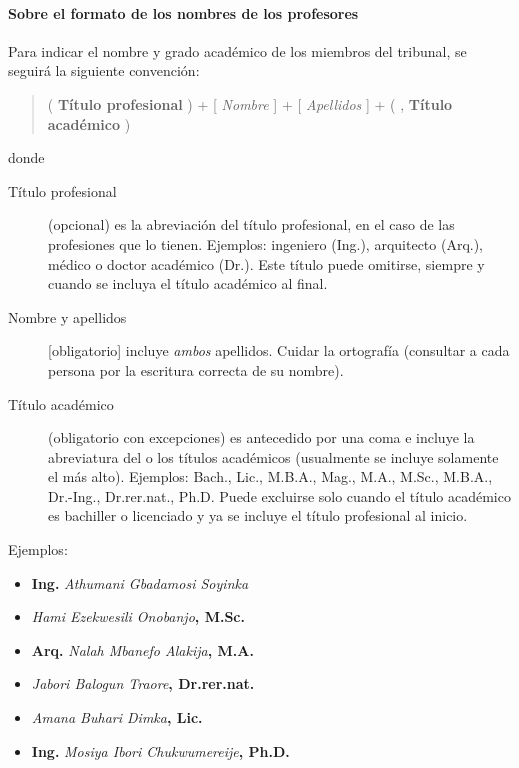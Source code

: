 \paragraph{Sobre el formato de los nombres de los profesores}

Para indicar el nombre y grado académico de los miembros del tribunal, se seguirá la siguiente convención:

\begin{quote}
\centering
( \textbf{Título profesional} ) + [ \textit{Nombre} ] + [ \textit{Apellidos} ] + ( , \textbf{Título académico} )
\end{quote}

donde

\begin{description}
\item[Título profesional] (opcional) es la abreviación del título profesional, en el caso de las profesiones que lo tienen. Ejemplos: ingeniero (Ing.), arquitecto (Arq.), médico o doctor académico (Dr.). Este título puede omitirse, siempre y cuando se incluya el título académico al final.
\item[Nombre y apellidos] [obligatorio] incluye \emph{ambos} apellidos. Cuidar la ortografía (consultar a cada persona por la escritura correcta de su nombre).
\item[Título académico] (obligatorio con excepciones) es antecedido por una coma e incluye la abreviatura del o los títulos académicos (usualmente se incluye solamente el más alto). Ejemplos: Bach., Lic., M.B.A., Mag., M.A., M.Sc., M.B.A., Dr.-Ing., Dr.rer.nat., Ph.D. Puede excluirse solo cuando el título académico es bachiller o licenciado y ya se incluye el título profesional al inicio.
\end{description}

Ejemplos:

\begin{multicols}{2}

\begin{itemize}
\item \textbf{Ing.} \textit{Athumani Gbadamosi Soyinka} 
\item \textit{Hami Ezekwesili Onobanjo}\textbf{, M.Sc.}
\item \textbf{Arq.} \textit{Nalah Mbanefo Alakija}\textbf{, M.A.}
\item \textit{Jabori Balogun Traore}\textbf{, Dr.rer.nat.}
\item \textit{Amana Buhari Dimka}\textbf{, Lic.}
\item \textbf{Ing.} \textit{Mosiya Ibori Chukwumereije}\textbf{, Ph.D.}
\end{itemize}
\end{multicols}
